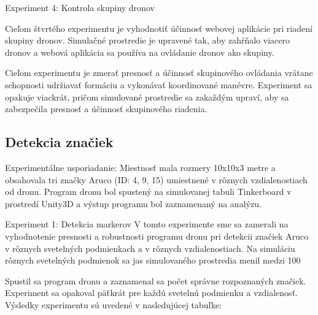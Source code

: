 Experiment 4: Kontrola skupiny dronov

Cieľom štvrtého experimentu je vyhodnotiť účinnosť webovej aplikácie pri riadení skupiny dronov. Simulačné prostredie je upravené tak, aby zahŕňalo viacero dronov a webová aplikácia sa používa na ovládanie dronov ako skupiny.

Cieľom experimentu je zmerať presnosť a účinnosť skupinového ovládania vrátane schopnosti udržiavať formáciu a vykonávať koordinované manévre. Experiment sa opakuje viackrát, pričom simulované prostredie sa zakaždým upraví, aby sa zabezpečila presnosť a účinnosť skupinového riadenia.

\subsection{Detekcia značiek}
Experimentálne usporiadanie:
Miestnosť mala rozmery 10x10x3 metre a obsahovala tri značky Aruco (ID: 4, 9, 15) umiestnené v rôznych vzdialenostiach od dronu. Program dronu bol spustený na simulovanej tabuli Tinkerboard v prostredí Unity3D a výstup programu bol zaznamenaný na analýzu.

Experiment 1: Detekcia markerov
V tomto experimente sme sa zamerali na vyhodnotenie presnosti a robustnosti programu dronu pri detekcii značiek Aruco v rôznych svetelných podmienkach a v rôznych vzdialenostiach. Na simuláciu rôznych svetelných podmienok sa jas simulovaného prostredia menil medzi 100 %

Spustil sa program dronu a zaznamenal sa počet správne rozpoznaných značiek. Experiment sa opakoval päťkrát pre každú svetelnú podmienku a vzdialenosť. Výsledky experimentu sú uvedené v nasledujúcej tabuľke:

